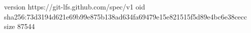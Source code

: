 version https://git-lfs.github.com/spec/v1
oid sha256:73d3194d621e69b99e875b138ad634fa69479e15e821515f5d89e4bc6e38cecc
size 87544
